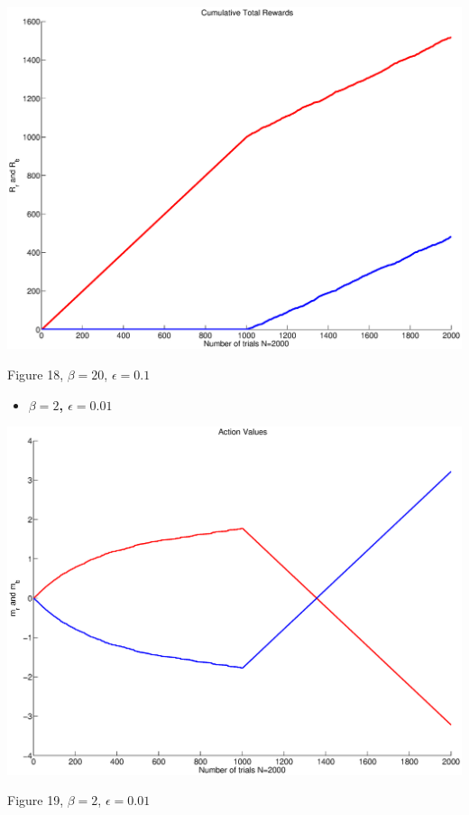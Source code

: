 \documentclass{article}
\begin{document}
\begin{center}
\includegraphics[width=\textwidth]{d_rew2.eps}
\begin{footnotesize}
 Figure 18, $\beta=20$, $\epsilon=0.1$
\end{footnotesize}
\end{center}

\begin{itemize}
 \item \textbf{ $\beta=2$, $\epsilon=0.01$}
\end{itemize}

\begin{center}
\includegraphics[width=\textwidth]{d_action3.eps}
\begin{footnotesize}
 Figure 19, $\beta=2$, $\epsilon=0.01$
\end{footnotesize}
\end{center}
\end{document}
